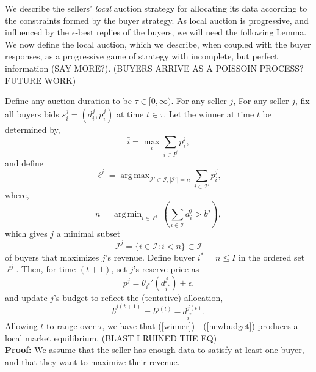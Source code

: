 \documentclass[12pt]{article}
\theoremstyle{definition}
\newcommand{\mcI}{\mathcal{I}}
\DeclareMathOperator*{\argmax}{arg\,max}
\DeclareMathOperator*{\argmin}{arg\,min}
\begin{document}
\begin{multicols}{2}
We describe the sellers' \emph{local} auction strategy for allocating its
data according to the constraints formed by the buyer strategy. As
local auction is progressive, and influenced by the $\epsilon$-best replies of
the buyers, we will need the following Lemma. 
We now define the local auction, which we describe, when coupled with the buyer
responses, as a progressive game of strategy with incomplete, but perfect
information (SAY MORE?).
(BUYERS ARRIVE AS A POISSOIN PROCESS? FUTURE WORK)

{
\label{sellerstrategy}
Define any auction duration to be $\tau \in [0,\infty)$. For any seller $j$,
For any seller $j$, fix all buyers bids $s_i^j=(d_i^j,p_i^j)$ at time $t\in\tau$.
Let the winner at time $t$ be determined by,
\begin{equation}\label{winner}
    \bar{i} = \displaystyle\max_{i}\sum_{i\in I^j} p_i^j,
\end{equation}
and define
$$
    \ell^j =\argmax_{{\mcI}' \subset \mcI, \vert{\mcI}'\vert =
n}\sum_{i\in{\mcI}'} p_i^j,
$$
where,
\begin{equation}\label{sellercoordinate}
    n = \argmin_{i\in\ell^j}(\displaystyle\sum_{i\in\mcI} d_i^j >
b^j),
\end{equation} 
which gives $j$ a minimal subset 
\begin{equation}\label{buyers}
    \mcI^j = \lbrace i \in \mcI : i < n\rbrace \subset \mcI
\end{equation} 
of buyers that maximizes $j$'s revenue.
Define buyer $i^* = n \le I$ in the ordered set $\ell^j$.
Then, for time $(t+1)$, set $j$'s reserve price as 
\begin{equation}\label{newprice}
    p^j = \theta_{i^*}'(d_{i^*}^j) + \epsilon.
\end{equation}
and update $j$'s budget to reflect the (tentative) allocation,
\begin{equation}\label{newbudget}
    \bar{b}^{j(t+1)} = b^{j(t)} - d_{i^*}^{j(t)}.
\end{equation}
Allowing $t$ to range over $\tau$, we have that (\ref{winner}) - (\ref{newbudget}) produces a local
market equilibrium. (BLAST I RUINED THE EQ) %
}\\
\textbf{Proof:}
We assume that the seller has enough data to satisfy at least one buyer,
and that they want to maximize their revenue.

\end{multicols}
\end{document}
